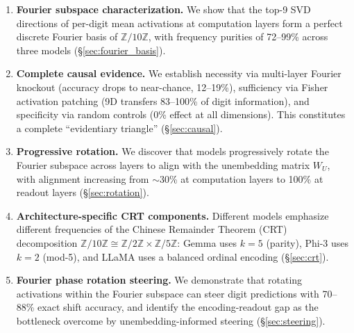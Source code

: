 \begin{enumerate}
    \item \textbf{Fourier subspace characterization.} We show that the top-9 SVD directions of per-digit mean activations at computation layers form a perfect discrete Fourier basis of $\mathbb{Z}/10\mathbb{Z}$, with frequency purities of 72--99\% across three models (\S\ref{sec:fourier_basis}).

    \item \textbf{Complete causal evidence.} We establish necessity via multi-layer Fourier knockout (accuracy drops to near-chance, 12--19\%), sufficiency via Fisher activation patching (9D transfers 83--100\% of digit information), and specificity via random controls (0\% effect at all dimensions). This constitutes a complete ``evidentiary triangle'' (\S\ref{sec:causal}).

    \item \textbf{Progressive rotation.} We discover that models progressively rotate the Fourier subspace across layers to align with the unembedding matrix $W_U$, with alignment increasing from $\sim$30\% at computation layers to 100\% at readout layers (\S\ref{sec:rotation}).

    \item \textbf{Architecture-specific CRT components.} Different models emphasize different frequencies of the Chinese Remainder Theorem (CRT) decomposition $\mathbb{Z}/10\mathbb{Z} \cong \mathbb{Z}/2\mathbb{Z} \times \mathbb{Z}/5\mathbb{Z}$: Gemma uses $k{=}5$ (parity), Phi-3 uses $k{=}2$ (mod-5), and LLaMA uses a balanced ordinal encoding (\S\ref{sec:crt}).

    \item \textbf{Fourier phase rotation steering.} We demonstrate that rotating activations within the Fourier subspace can steer digit predictions with 70--88\% exact shift accuracy, and identify the encoding-readout gap as the bottleneck overcome by unembedding-informed steering (\S\ref{sec:steering}).
\end{enumerate}
